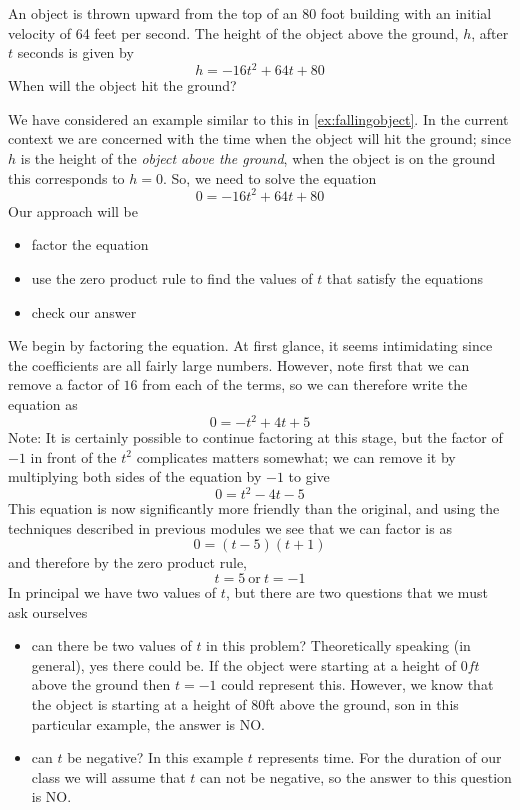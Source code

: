 \begin{myexample}
An object is thrown upward from the top of an 80 foot building with an initial
velocity of 64 feet per second. The height of the object above the ground, $h$, after
$t$ seconds is given by
\[
	h = -16t^2+64t+80
\]
When will the object hit the ground? 
\end{myexample}
\begin{myProof}
	We have considered an example similar to this in \vref{ex:fallingobject}. In the current context
	we are concerned with the time when the object will hit the ground; since $h$ is the height of the {\em object
		above the ground}, when the object is on the ground this corresponds to $h=0$. So, we need to solve the equation
	\[
		0=-16t^2+64t+80
	\]
	Our approach will be
	\begin{itemize}
		\item factor the equation
		\item use the zero product rule to find the values of $t$ that satisfy the equations
		\item check our answer
	\end{itemize} 
				
	We begin by factoring the equation. At first glance, it seems intimidating since the coefficients are all fairly
	large numbers. However, note first that we can remove a factor of $16$ from each of the terms, so we can therefore
	write the equation as
	\[
		0=-t^2+4t+5
	\]
	Note: It is certainly possible to continue factoring at this stage, but the factor of $-1$ in front of the $t^2$ complicates
	matters somewhat; we can remove it by multiplying both sides of the equation by $-1$ to give
	\[
		0 = t^2-4t-5
	\]
	This equation is now significantly more friendly than the original, and using the techniques described in previous modules we see
	that we can factor is as
	\[
		0=(t-5)(t+1)
	\]
	and therefore by the zero product rule,
	\[
		t=5 {\mathrm{~or~}} t=-1
	\]
	In principal we have two values of $t$, but there are two questions that we must ask ourselves
	\begin{itemize}
		\item {\color{red}can there be two values of $t$ in this problem?} Theoretically speaking (in general), yes there could be. If the object
		were starting at a height of $0ft$ above the ground then $t=-1$ could represent this. However, we know that the object is starting
		at a height of 80ft above the ground, son in this particular example, the answer is NO.
		\item {\color{red}can $t$ be negative?} In this example $t$ represents time. For the duration of our class we will assume that $t$ can not 
		be negative, so the answer to this question is NO.
	\end{itemize} 
				

\end{myProof}
